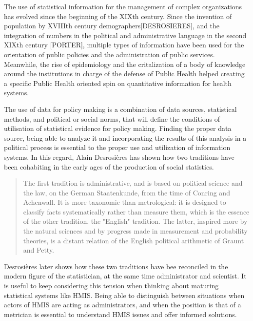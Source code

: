 The use of statistical information for the management of complex organizations has evolved since the beginning of the XIXth century. Since the invention of population by XVIIIth century demographers[DESROSIERES], and the integration of numbers in the political and administrative language in the second XIXth century [PORTER], multiple types of information have been used for the orientation of public policies and the administration of public services. Meanwhile, the rise of epidemiology and the critalization of a body of knowledge around the institutions in charge of the defense of Public Health helped creating a specific Public Health oriented spin on quantitative information for health systems.

The use of data for policy making is a combination of data sources, statistical methods, and political or social norms, that will define the conditions of utilisation of statistical evidence for policy making. Finding the proper data source, being able to analyze it and incorporating the results of this analysis in a political process is essential to the proper use and utilization of information systems. In this regard, Alain Desrosières has shown how two traditions have been cohabiting in the early ages of the production of social statistics\cite{admin_savant}.



\begin{quote}
The first tradition is administrative, and is based on political science and the law, on the German Staatenkunde, from the time of Conring and Achenwall. It is more taxonomic than metrological: it is designed to classify facts systematically rather than measure them, which is the essence of the other tradition, the "English" tradition. The latter, inspired more by the natural sciences and by progress made in measurement and probability theories, is a distant relation of the English political arithmetic of Graunt and Petty.
\end{quote}

Desrosières later shows how these two traditions have bee reconciled in the modern figure of the statistician, at the same time administrator and scientist. It is useful to keep considering this tension when thinking about maturing statistical systems like HMIS. Being able to distinguish between situations when actors of HMIS are acting as administrators, and when the position is that of a metrician is essential to understand HMIS issues and offer informed solutions.

